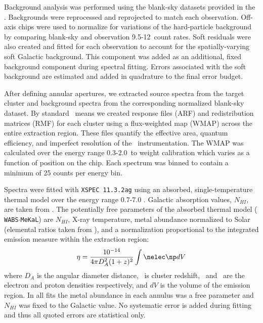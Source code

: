 \documentclass[12pt, preprint]{aastex}
\begin{document}
Background analysis was performed using the blank-sky datasets provided
in the \Caldb. Backgrounds were reprocessed and reprojected to match
each observation. Off-axis chips were used to normalize for variations
of the hard-particle background by comparing blank-sky and observation
9.5-12\keV\ count rates. Soft residuals were also created and fitted
for each observation to account for the spatially-varying soft
Galactic background. This component was added as an additional, fixed
background component during spectral fitting. Errors associated with
the soft background are estimated and added in quadrature to the final
error budget.

After defining annular apertures, we extracted source spectra from the
target cluster and background spectra from the corresponding
normalized blank-sky dataset. By standard \Ciao\ means we created
response files (ARF) and redistribution matrices (RMF) for each
cluster using a flux-weighted map (WMAP) across the entire extraction
region. These files quantify the effective area, quantum efficiency,
and imperfect resolution of the \Chandra\ instrumentation. The WMAP
was calculated over the energy range 0.3-2.0\keV\ to weight
calibration which varies as a function of position on the chip. Each
spectrum was binned to contain a minimum of 25 counts per energy bin.

Spectra were fitted with {\tt XSPEC 11.3.2ag}
\citep{1996ASPC..101...17A} using an absorbed, single-temperature
thermal model over the energy range 0.7-7.0 \keV. Galactic absorption
values, $N_{HI}$, are taken from \cite{1990ARA&A..28..215D}. The
potentially free parameters of the absorbed thermal model ({\tt
WABS$\cdot$MeKaL}) are $N_{HI}$, X-ray temperature, metal abundance
normalized to Solar (elemental ratios taken from
\cite{1989GeCoA..53..197A}), and a normalization proportional to the
integrated emission measure within the extraction region:
\begin{equation}
\label{eqn:norm}
\eta = \frac{10^{-14}}{4\pi D_A^2(1+z)^2}\int \nelec \np dV\\
\end{equation}
where $D_A$ is the angular diameter distance, \red\ is cluster
redshift, \nelec\ and \np\ are the electron and proton densities
respectively, and $dV$ is the volume of the emission region. In all
fits the metal abundance in each annulus was a free parameter and
$N_{HI}$ was fixed to the Galactic value. No systematic error is added
during fitting and thus all quoted errors are statistical only.
\end{document}
